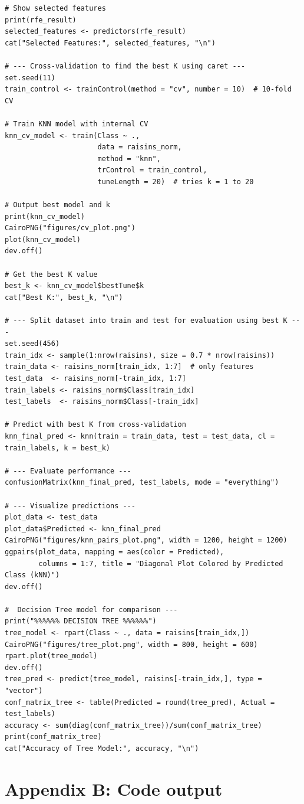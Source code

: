 \documentclass{article}
\begin{document}
\begin{thebibliography}{9}
\begin{verbatim}
# Show selected features
print(rfe_result)
selected_features <- predictors(rfe_result)
cat("Selected Features:", selected_features, "\n")

# --- Cross-validation to find the best K using caret ---
set.seed(11)
train_control <- trainControl(method = "cv", number = 10)  # 10-fold CV

# Train KNN model with internal CV
knn_cv_model <- train(Class ~ ., 
                      data = raisins_norm, 
                      method = "knn", 
                      trControl = train_control, 
                      tuneLength = 20)  # tries k = 1 to 20

# Output best model and k
print(knn_cv_model)
CairoPNG("figures/cv_plot.png")
plot(knn_cv_model)
dev.off()

# Get the best K value
best_k <- knn_cv_model$bestTune$k
cat("Best K:", best_k, "\n")

# --- Split dataset into train and test for evaluation using best K ---
set.seed(456)
train_idx <- sample(1:nrow(raisins), size = 0.7 * nrow(raisins))
train_data <- raisins_norm[train_idx, 1:7]  # only features
test_data  <- raisins_norm[-train_idx, 1:7]
train_labels <- raisins_norm$Class[train_idx]
test_labels  <- raisins_norm$Class[-train_idx]

# Predict with best K from cross-validation
knn_final_pred <- knn(train = train_data, test = test_data, cl = train_labels, k = best_k)

# --- Evaluate performance ---
confusionMatrix(knn_final_pred, test_labels, mode = "everything")

# --- Visualize predictions ---
plot_data <- test_data
plot_data$Predicted <- knn_final_pred
CairoPNG("figures/knn_pairs_plot.png", width = 1200, height = 1200)
ggpairs(plot_data, mapping = aes(color = Predicted),
        columns = 1:7, title = "Diagonal Plot Colored by Predicted Class (kNN)")
dev.off()

#  Decision Tree model for comparison ---
print("%%%%%% DECISION TREE %%%%%%")
tree_model <- rpart(Class ~ ., data = raisins[train_idx,])
CairoPNG("figures/tree_plot.png", width = 800, height = 600)
rpart.plot(tree_model)
dev.off()
tree_pred <- predict(tree_model, raisins[-train_idx,], type = "vector")
conf_matrix_tree <- table(Predicted = round(tree_pred), Actual = test_labels)
accuracy <- sum(diag(conf_matrix_tree))/sum(conf_matrix_tree)
print(conf_matrix_tree)
cat("Accuracy of Tree Model:", accuracy, "\n")
\end{verbatim}
\newpage
\section*{Appendix B: Code output}
\label{sec:appendixB}


\end{thebibliography}
\end{document}
